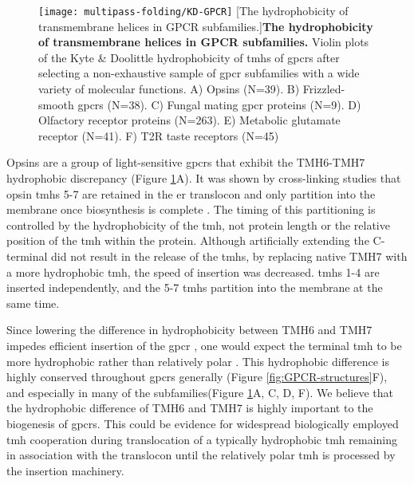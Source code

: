 \begin{figure}[!ht]
\centering
\texttt{[image: multipass-folding/KD-GPCR]}
		[The hydrophobicity of transmembrane helices in GPCR subfamilies.]{\textbf{The hydrophobicity of transmembrane helices in GPCR subfamilies.}
    Violin plots of the Kyte \& Doolittle hydrophobicity \cite{Kyte1982} of \gls{tmh}s of \gls{gpcr}s after selecting a non-exhaustive sample of \gls{gpcr} subfamilies with a wide variety of molecular functions.
    A) Opsins (N=39).
    B) Frizzled-smooth \gls{gpcr}s (N=38).
    C) Fungal mating \gls{gpcr} proteins (N=9).
    D) Olfactory receptor proteins (N=263).
    E) Metabolic glutamate receptor (N=41).
    F) T2R taste receptors (N=45)
    }

\label{fig:KD-GPCR}
\end{figure}

Opsins are a group of light\--sensitive \gls{gpcr}s that exhibit the TMH6\--TMH7 hydrophobic discrepancy (Figure \ref{fig:KD-GPCR}A).
It was shown by cross\--linking studies that opsin \gls{tmh}s 5-7 are retained in the \gls{er} translocon and only partition into the membrane once biosynthesis is complete \cite{Ismail2008}.
The timing of this partitioning is controlled by the hydrophobicity of the \gls{tmh}, not protein length or the relative position of the \gls{tmh} within the protein.
Although artificially extending the C-terminal did not result in the release of the \gls{tmh}s, by replacing native TMH7 with a more hydrophobic \gls{tmh}, the speed of insertion was decreased.
\gls{tmh}s 1-4 are inserted independently, and the 5-7 \gls{tmh}s partition into the membrane at the same time.

Since lowering the difference in hydrophobicity between TMH6 and TMH7 impedes efficient insertion of the \gls{gpcr} \cite{Ismail2008}, one would expect the terminal \gls{tmh} to be more hydrophobic rather than relatively polar \cite{Virkki2014}.
This hydrophobic difference is highly conserved throughout \gls{gpcr}s generally (Figure \ref{fig:GPCR-structures}F), and especially in many of the subfamilies(Figure \ref{fig:KD-GPCR}A, C, D, F).
We believe that the hydrophobic difference of TMH6 and TMH7 is highly important to the biogenesis of \gls{gpcr}s.
This could be evidence for widespread biologically employed \gls{tmh} cooperation during translocation of a typically hydrophobic \gls{tmh} remaining in association with the translocon until the relatively polar \gls{tmh} is processed by the insertion machinery.


